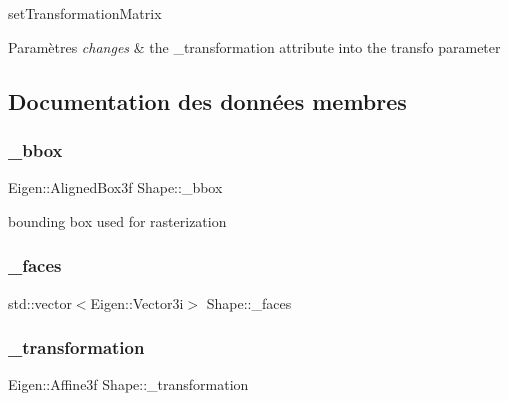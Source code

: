 set\+Transformation\+Matrix 


\begin{DoxyParams}{Paramètres}
{\em changes} & the \+\_\+transformation attribute into the transfo parameter \\
\hline
\end{DoxyParams}


\subsection{Documentation des données membres}
\mbox{\label{class_shape_aa2399d2b2884c25ebc2e8f87584cc529}} 
\subsubsection{\texorpdfstring{\+\_\+bbox}{\_bbox}}
{\footnotesize\ttfamily Eigen\+::\+Aligned\+Box3f Shape\+::\+\_\+bbox\hspace{0.3cm}{\ttfamily [protected]}}



bounding box used for rasterization 

\mbox{\label{class_shape_abb07b26e344946f745964c019a2c598e}} 
\subsubsection{\texorpdfstring{\+\_\+faces}{\_faces}}
{\footnotesize\ttfamily std\+::vector$<$Eigen\+::\+Vector3i$>$ Shape\+::\+\_\+faces\hspace{0.3cm}{\ttfamily [protected]}}

\mbox{\label{class_shape_a67c0ffb0290a2a1ff5e602c324130332}} 
\subsubsection{\texorpdfstring{\+\_\+transformation}{\_transformation}}
{\footnotesize\ttfamily Eigen\+::\+Affine3f Shape\+::\+\_\+transformation\hspace{0.3cm}{\ttfamily [protected]}}



